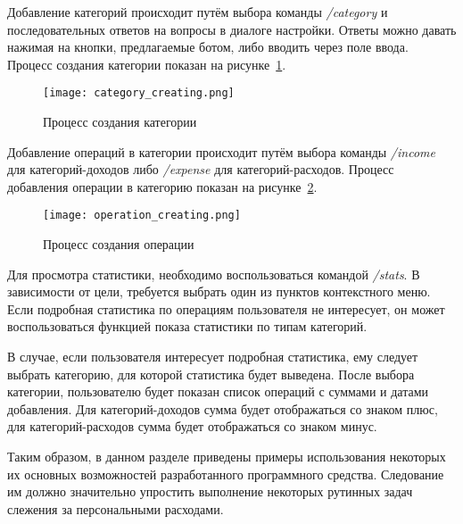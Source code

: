 Добавление категорий происходит путём выбора команды \emph{/category} и последовательных ответов на вопросы в диалоге настройки. Ответы можно давать нажимая на кнопки, предлагаемые ботом, либо вводить через поле ввода. Процесс создания категории показан на рисунке~\ref{fig:manual:category_creating}.

\begin{figure}[ht]
\centering
	\texttt{[image: category\_creating.png]}
	\caption{Процесс создания категории}
	\label{fig:manual:category_creating}
\end{figure}

Добавление операций в категории происходит путём выбора команды \emph{/income} для категорий-доходов либо \emph{/expense} для категорий-расходов. Процесс добавления операции в категорию показан на рисунке~\ref{fig:manual:operation_creating}.

\begin{figure}[ht]
\centering
	\texttt{[image: operation\_creating.png]}
	\caption{Процесс создания операции}
	\label{fig:manual:operation_creating}
\end{figure}

Для просмотра статистики, необходимо воспользоваться командой \emph{/stats}. В зависимости от цели, требуется выбрать один из пунктов контекстного меню. Если подробная статистика по операциям пользователя не интересует, он может воспользоваться функцией показа статистики по типам категорий. 

В случае, если пользователя интересует подробная статистика, ему следует выбрать категорию, для которой статистика будет выведена. После выбора категории, пользователю будет показан список операций с суммами и датами добавления. Для категорий-доходов сумма будет отображаться со знаком плюс, для категорий-расходов сумма будет отображаться со знаком минус.

Таким образом, в данном разделе приведены примеры использования некоторых их основных возможностей разработанного программного средства. Следование им должно значительно упростить выполнение некоторых рутинных задач слежения за персональными расходами.

